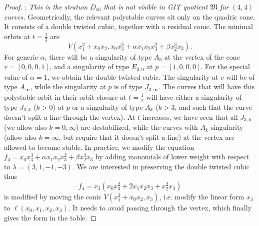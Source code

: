 \documentclass[11pt]{amsart}
\numberwithin{equation}{section}
\theoremstyle{plain}
\theoremstyle{remark}
\theoremstyle{definition}
\newcommand{\gM}{\mathfrak{M}}
\begin{document}
\begin{proof}
: {\it This is the stratum $D_{16}$ that is not visible in GIT quotient $\gM$ for $(4,4)$ curves. } Geometrically, the relevant polystable curves sit only on the quadric cone. It consists of a double twisted cubic, together with a residual conic. 
The minimal orbits at $t=\frac{1}{3}$ are 
$$V(x_1^2+x_0x_2,x_0x_3^3+\alpha x_1x_2x_3^2+\beta x_2^3x_3).$$
For generic $\alpha$, there will be a singularity of type $A_3$ at the vertex of the cone $v=[0,0,0,1]$, and a singularity of type $E_{3,0}$ at $p=[1,0,0,0]$. For the special value of $\alpha=1$, we obtain the double twisted cubic. The singularity at $v$ will be of type $A_{\infty}$, while the singularity at $p$ is of type $J_{3,\infty}$. The curves that will have this polystable orbit in their orbit closure at $t=\frac{1}{2}$ will have either a singularity of type $J_{3,k}$ ($k>0$) at $p$ or a singularity of type $A_k$ ($k>3$, and such that the curve doesn't split a line through the vertex). At $t$ increases, we have seen that all $J_{3,k}$ (we allow also $k=0,\infty$) are destabilized, while the curves with $A_k$ singularity (allow also $k=\infty$, but require that it doesn't split a line) at the vertex are allowed to become stable. In practice, we modify the equation $f_4=x_0x_3^3+\alpha x_1x_2x_3^2+\beta x_2^3x_3$ by adding monomials of lower weight with respect to $\lambda=(3,1,-1,-3)$. 
We are interested in preserving the double twisted cubic thus
$$f_4=x_3(x_0x_3^2+2x_1x_2x_3+x_2^2x_3)$$
is modified by moving the conic $V(x_1^2+x_0x_2,x_3)$, i.e. modify the linear form $x_3$ to $\ell(x_0,x_1,x_2,x_3)$. It needs to avoid passing through the vertex, which finally gives the form in the table. 
\end{proof}




\appendix
\end{document}

